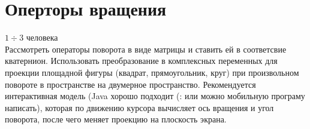 \documentclass{article}
\begin{document}
\section*{Оперторы вращения}
$1\div3$ человека \\
Рассмотреть операторы поворота в виде матрицы и ставить ей в соответсвие кватернион. 
Использовать преобразование в комплексных переменных для проекции площадной фигуры (квадрат, прямоугольник, круг) при произвольном повороте в пространстве на двумерное пространство. Рекомендуется интерактивная модель (Java хорошо подходит (: или можно мобильную програму написать), которая по движению курсора вычисляет ось вращения и угол поворота, после чего меняет проекцию на плоскость экрана.



\end{document}

